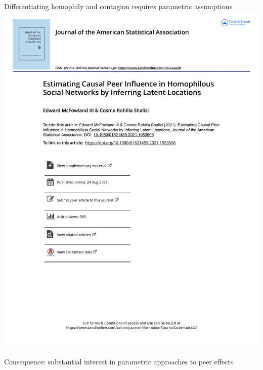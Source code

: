 \documentclass[aspectratio=169]{beamer}
\theoremstyle{remark}
\begin{document}
\begin{frame}{Differentiating homophily and contagion requires parametric assumptions}
    \centering
    \includegraphics[width=\textwidth, page=2, trim={1.5cm 16cm 0 3.3cm}, clip]{./papers/shalizi.pdf}
    
    Consequence: substantial interest in parametric approaches to peer effects
\end{frame}
\end{document}
